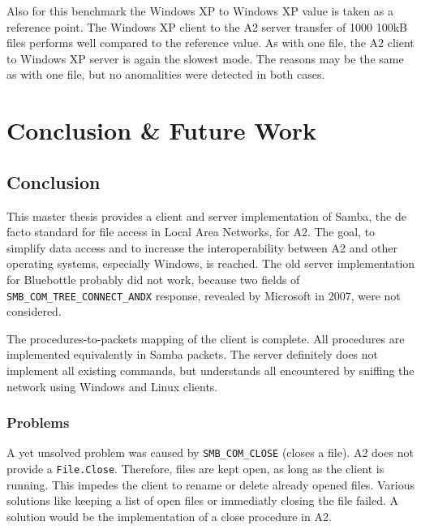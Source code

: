 \documentclass[11pt,a4paper]{book}
\begin{document}
Also for this benchmark the Windows XP to Windows XP value is taken as a reference point. The Windows XP client to the A2 server transfer of 1000 100kB files performs well compared to the reference value. As with one file, the A2 client to Windows XP server is again the slowest mode. The reasons may be the same as with one file, but no anomalities were detected in both cases.

\chapter{Conclusion \& Future Work}

\section{Conclusion}
This master thesis provides a client and server implementation of Samba, the de facto standard for file access in Local Area Networks, for A2. The goal, to simplify data access and to increase the interoperability between A2 and other operating systems, especially Windows, is reached. The old server implementation for Bluebottle probably did not work, because two fields of \texttt{SMB\_COM\_TREE\_CONNECT\_ANDX} response, revealed by Microsoft in 2007, were not considered.

The procedures-to-packets mapping of the client is complete. All procedures are implemented equivalently in Samba packets. The server definitely does not implement all existing commands, but understands all encountered by sniffing the network using Windows and Linux clients.

\subsection{Problems}
A yet unsolved problem was caused by \texttt{SMB\_COM\_CLOSE} (closes a file). A2 does not provide a \texttt{File.Close}. Therefore, files are kept open, as long as the client is running. This impedes the client to rename or delete already opened files. Various solutions like keeping a list of open files or immediatly closing the file failed. A solution would be the implementation of a close procedure in A2.
\end{document}
